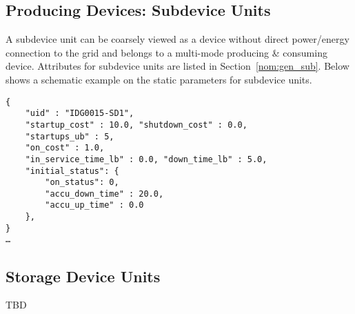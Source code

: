 \subsection{Producing Devices: Subdevice Units}
\label{sec:subdevice}
A subdevice unit can be coarsely viewed as 
a device without direct power/energy connection
to the grid and belongs to a multi-mode producing \& consuming device.
Attributes for subdevice units are listed in Section~\ref{nom:gen_sub}.
Below shows a schematic example on the static parameters for subdevice units.


\begin{verbatim}
{
    "uid" : "IDG0015-SD1",
    "startup_cost" : 10.0, "shutdown_cost" : 0.0,
    "startups_ub" : 5,
    "on_cost" : 1.0,
    "in_service_time_lb" : 0.0, "down_time_lb" : 5.0,
    "initial_status": {
        "on_status": 0,
        "accu_down_time" : 20.0,
        "accu_up_time" : 0.0
    },    
}
…     
\end{verbatim}

\subsection{Storage Device Units}
\label{sec:storage}
\begin{todo}[]{}
TBD 
\end{todo}


